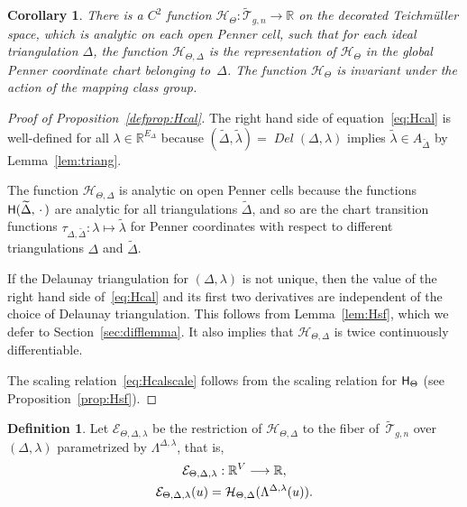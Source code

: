 \documentclass[a4paper, 11pt]{article}
\newcommand{\R}{\mathbb{R}}
\newcommand{\Teich}{\mathcal{T}}
\newcommand{\decTeich}{\widetilde{\Teich}}
\newcommand{\Tm}{Teich\-m{\"u}l\-ler}
\newcommand{\Deltil}{\widetilde{\Delta}}
\newcommand{\lamtil}{\tilde{\lambda}}
\newcommand{\Del}{\operatorname{\textit{Del}}}
\newcommand{\Hcal}{\mathcal{H}}
\newcommand{\Ecal}{\mathcal{E}}
\newcommand{\Hsf}{\scalebox{0.94}{$\mathsf{H}$}}
\theoremstyle{plain}
\newtheorem{corollary}[theorem]{Corollary}
\theoremstyle{definition}
\newtheorem{definition}[theorem]{Definition}
\begin{document}
\begin{corollary}
  \label{cor:Hcal}
  There is a $C^{2}$ function
  $\Hcal_{\Theta}:\decTeich_{g,n}\rightarrow\R$ on the decorated {\Tm}
  space, which is analytic on each open Penner cell, such that for
  each ideal triangulation $\Delta$, the function
  $\Hcal_{\Theta,\Delta}$ is the representation of $\Hcal_{\Theta}$ in
  the global Penner coordinate chart belonging to~$\Delta$. The
  function $\Hcal_{\Theta}$ is invariant under the action of the
  mapping class group.
\end{corollary}

\begin{proof}[Proof of Proposition~\ref{defprop:Hcal}]
  The right hand side of equation~\eqref{eq:Hcal} is well-defined for
  all $\lambda\in\R^{E_{\Delta}}$ because
  $(\Deltil,\lamtil)=\Del(\Delta,\lambda)$ implies
  $\lamtil\in A_{\Deltil}$ by Lemma~\ref{lem:triang}.

  The function $\Hcal_{\Theta,\Delta}$ is analytic on open
  Penner cells because the functions $\Hsf(\Deltil,\,\cdot\,)$ are
  analytic for all triangulations $\Deltil$, and so are the chart
  transition functions $\tau_{\Delta,\Deltil}:\lambda\mapsto\lamtil$
  for Penner coordinates with respect to different triangulations
  $\Delta$ and $\Deltil$.

  If the Delaunay triangulation for $(\Delta,\lambda)$ is not unique,
  then the value of the right hand side of~\eqref{eq:Hcal} and its
  first two derivatives are independent of the choice of Delaunay
  triangulation. This follows from Lemma~\ref{lem:Hsf}, which we defer
  to Section~\ref{sec:difflemma}. It also implies that
  $\Hcal_{\Theta,\Delta}$ is twice continuously differentiable.

  The scaling relation~\eqref{eq:Hcalscale} follows from the scaling
  relation for $\Hsf_{\Theta}$ (see Proposition~\ref{prop:Hsf}).
\end{proof}


\begin{definition}
  \label{def:Ecal}
  Let $\Ecal_{\Theta,\Delta,\lambda}$ be the restriction of
  $\Hcal_{\Theta,\Delta}$ to the fiber of~$\decTeich_{g,n}$
  over~$(\Delta,\lambda)$ parametrized by $\Lambda^{\Delta,\lambda}$,
  that is,
  \begin{gather}
    \notag
    \Ecal_{\Theta,\Delta,\lambda}:\R^{V}\longrightarrow\R,\\
    \label{eq:Ecal}
    \Ecal_{\Theta,\Delta,\lambda}(u)
    =\Hcal_{\Theta,\Delta}(\Lambda^{\Delta,\lambda}(u)).
  \end{gather}
\end{definition}
\end{document}

